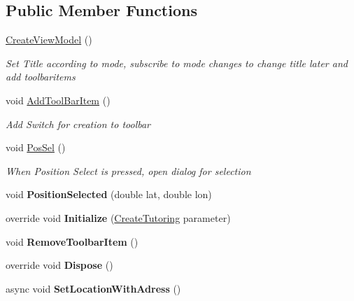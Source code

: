 \subsection*{Public Member Functions}
\begin{DoxyCompactItemize}
\item 
\mbox{\hyperlink{class_tutor_scout24_1_1_view_models_1_1_create_view_model_aa617a300b1411a5a4f28b5b72bf177d6}{Create\+View\+Model}} ()
\begin{DoxyCompactList}\small\item\em Set Title according to mode, subscribe to mode changes to change title later and add toolbaritems \end{DoxyCompactList}\item 
void \mbox{\hyperlink{class_tutor_scout24_1_1_view_models_1_1_create_view_model_afa96e3fde1e926d0bc909a817a8bdaaf}{Add\+Tool\+Bar\+Item}} ()
\begin{DoxyCompactList}\small\item\em Add Switch for creation to toolbar \end{DoxyCompactList}\item 
void \mbox{\hyperlink{class_tutor_scout24_1_1_view_models_1_1_create_view_model_a5002145ea2bc96424f202caee461f810}{Pos\+Sel}} ()
\begin{DoxyCompactList}\small\item\em When Position Select is pressed, open dialog for selection \end{DoxyCompactList}\item 
\mbox{\label{class_tutor_scout24_1_1_view_models_1_1_create_view_model_a07d907ea55e16e56744a3ccf787f9be0}} 
void {\bfseries Position\+Selected} (double lat, double lon)
\item 
\mbox{\label{class_tutor_scout24_1_1_view_models_1_1_create_view_model_ab469edfe5a4c4dcb0e7b50ab93572b3d}} 
override void {\bfseries Initialize} (\mbox{\hyperlink{class_tutor_scout24_1_1_models_1_1_tutorings_1_1_create_tutoring}{Create\+Tutoring}} parameter)
\item 
\mbox{\label{class_tutor_scout24_1_1_view_models_1_1_create_view_model_a3081038a79b7da05515b70ac13f91673}} 
void {\bfseries Remove\+Toolbar\+Item} ()
\item 
\mbox{\label{class_tutor_scout24_1_1_view_models_1_1_create_view_model_a712c72048ee79fd25c170838487fffc1}} 
override void {\bfseries Dispose} ()
\item 
\mbox{\label{class_tutor_scout24_1_1_view_models_1_1_create_view_model_ad2021b575ac16ac9877b1b29e2fe8e6a}} 
async void {\bfseries Set\+Location\+With\+Adress} ()
\end{DoxyCompactItemize}
